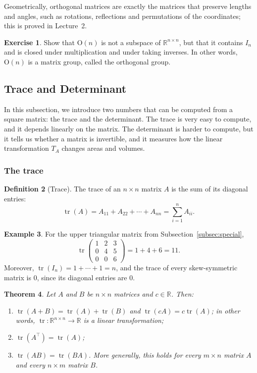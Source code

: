 \documentclass[11pt]{article}
\theoremstyle{definition}
\newtheorem{definition}{Definition}[section]
\newtheorem{example}[definition]{Example}
\newtheorem{exercise}[definition]{Exercise}
\theoremstyle{plain}
\newtheorem{theorem}[definition]{Theorem}
\theoremstyle{remark}
\DeclareMathOperator{\tr}{tr}
\begin{document}
Geometrically, orthogonal matrices are exactly the matrices that preserve lengths and angles, such as rotations, reflections and permutations of the coordinates; this is proved in Lecture~2.

\begin{exercise}
    Show that $\mathrm{O}(n)$ is not a subspace of $\mathbb{R}^{n \times n}$, but that it contains $I_n$ and is closed under multiplication and under taking inverses. In other words, $\mathrm{O}(n)$ is a matrix group, called the orthogonal group.
\end{exercise}

\subsection{Trace and Determinant}\label{subsec:trace-det}

In this subsection, we introduce two numbers that can be computed from a square matrix: the trace and the determinant. The trace is very easy to compute, and it depends linearly on the matrix. The determinant is harder to compute, but it tells us whether a matrix is invertible, and it measures how the linear transformation $T_A$ changes areas and volumes.

\subsubsection{The trace}

\begin{definition}[Trace]
    The trace of an $n \times n$ matrix $A$ is the sum of its diagonal entries:
    \[\tr(A) = A_{11} + A_{22} + \cdots + A_{nn} = \sum_{i=1}^n A_{ii}.\]
\end{definition}

\begin{example}
    For the upper triangular matrix from Subsection~\ref{subsec:special},
    \[\tr \begin{pmatrix}
        1 & 2 & 3 \\
        0 & 4 & 5 \\
        0 & 0 & 6
    \end{pmatrix} = 1 + 4 + 6 = 11.\]
    Moreover, $\tr(I_n) = 1 + \cdots + 1 = n$, and the trace of every skew-symmetric matrix is $0$, since its diagonal entries are $0$.
\end{example}

\begin{theorem}\label{thm:trace}
    Let $A$ and $B$ be $n \times n$ matrices and $c \in \mathbb{R}$. Then:
    \begin{enumerate}
        \item $\tr(A + B) = \tr(A) + \tr(B)$ and $\tr(cA) = c \tr(A)$; in other words, $\tr: \mathbb{R}^{n \times n} \to \mathbb{R}$ is a linear transformation;
        \item $\tr(A^\top) = \tr(A)$;
        \item $\tr(AB) = \tr(BA)$. More generally, this holds for every $m \times n$ matrix $A$ and every $n \times m$ matrix $B$.
    \end{enumerate}
\end{theorem}
\end{document}
